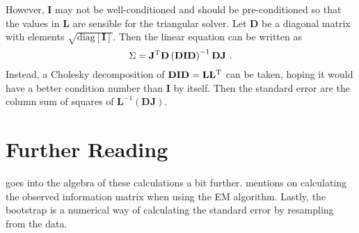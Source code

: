 \documentclass{article}
\newcommand{\T}{^\textup{T}}
\begin{document}
However, $\mathbf{I}$ may not be well-conditioned and should be pre-conditioned so that the values in $\mathbf{L}$ are sensible for the triangular solver. Let $\mathbf{D}$ be a diagonal matrix with elements $\sqrt{\text{diag}\left[\mathbf{I}\right]}$. Then the linear equation can be written as
\begin{equation}
    \Sigma = \mathbf{J}\T \mathbf{D} \left(\mathbf{D}\mathbf{I}\mathbf{D}\right)^{-1} \mathbf{D} \mathbf{J} \ .
\end{equation}
Instead, a Cholesky decomposition of $\mathbf{D}\mathbf{I}\mathbf{D} = \mathbf{L}\mathbf{L}\T$ can be taken, hoping it would have a better condition number than $\mathbf{I}$ by itself. Then the standard error are the column sum of squares of $\mathbf{L}^{-1} \left(\mathbf{D}\mathbf{J}\right)$.

\section{Further Reading}
\cite{doi:10.1080/01621459.1997.10473658} goes into the algebra of these calculations a bit further. \cite{10.2307/2345828} mentions on calculating the observed information matrix when using the EM algorithm. Lastly, the bootstrap \citep{efron1979bootstrap} is a numerical way of calculating the standard error by resampling from the data.



\end{document}

